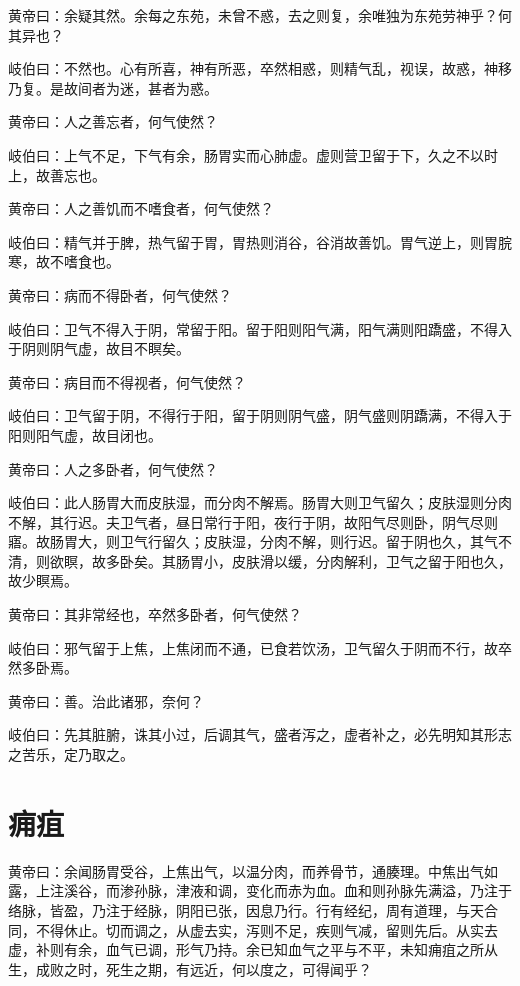 \documentclass[a4paper,12pt,UTF8,twoside]{ctexbook}
\begin{document}
	黄帝曰：余疑其然。余每之东苑，未曾不惑，去之则复，余唯独为东苑劳神乎？何其异也？
	
	岐伯曰：不然也。心有所喜，神有所恶，卒然相惑，则精气乱，视误，故惑，神移乃复。是故间者为迷，甚者为惑。
	
	黄帝曰：人之善忘者，何气使然？
	
	岐伯曰：上气不足，下气有余，肠胃实而心肺虚。虚则营卫留于下，久之不以时上，故善忘也。
	
	黄帝曰：人之善饥而不嗜食者，何气使然？
	
	岐伯曰：精气并于脾，热气留于胃，胃热则消谷，谷消故善饥。胃气逆上，则胃脘寒，故不嗜食也。
	
	黄帝曰：病而不得卧者，何气使然？
	
	岐伯曰：卫气不得入于阴，常留于阳。留于阳则阳气满，阳气满则阳蹻盛，不得入于阴则阴气虚，故目不瞑矣。
	
	黄帝曰：病目而不得视者，何气使然？
	
	岐伯曰：卫气留于阴，不得行于阳，留于阴则阴气盛，阴气盛则阴蹻满，不得入于阳则阳气虚，故目闭也。
	
	黄帝曰：人之多卧者，何气使然？
	
	岐伯曰：此人肠胃大而皮肤湿，而分肉不解焉。肠胃大则卫气留久；皮肤湿则分肉不解，其行迟。夫卫气者，昼日常行于阳，夜行于阴，故阳气尽则卧，阴气尽则寤。故肠胃大，则卫气行留久；皮肤湿，分肉不解，则行迟。留于阴也久，其气不清，则欲瞑，故多卧矣。其肠胃小，皮肤滑以缓，分肉解利，卫气之留于阳也久，故少瞑焉。
	
	黄帝曰：其非常经也，卒然多卧者，何气使然？
	
	岐伯曰：邪气留于上焦，上焦闭而不通，已食若饮汤，卫气留久于阴而不行，故卒然多卧焉。
	
	黄帝曰：善。治此诸邪，奈何？
	
	岐伯曰：先其脏腑，诛其小过，后调其气，盛者泻之，虚者补之，必先明知其形志之苦乐，定乃取之。
	
	\chapter{痈疽}
	
	黄帝曰：余闻肠胃受谷，上焦出气，以温分肉，而养骨节，通腠理。中焦出气如露，上注溪谷，而渗孙脉，津液和调，变化而赤为血。血和则孙脉先满溢，乃注于络脉，皆盈，乃注于经脉，阴阳已张，因息乃行。行有经纪，周有道理，与天合同，不得休止。切而调之，从虚去实，泻则不足，疾则气减，留则先后。从实去虚，补则有余，血气已调，形气乃持。余已知血气之平与不平，未知痈疽之所从生，成败之时，死生之期，有远近，何以度之，可得闻乎？
	
\end{document}
